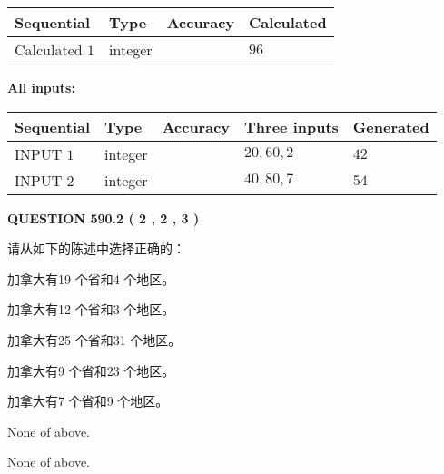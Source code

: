 \documentclass{ctexart}
\begin{document}
  
\noindent\begin{tabular}{|l|l|l|l|}
\hline
 Sequential & Type & Accuracy & Calculated \\ 
\hline
 
 
  Calculated $  1 $ & integer &  & 
  $ 96 $ 
 \\  \hline  
 \end{tabular}
   
   
   
   
\noindent\vspace{0.1in}\hspace{-0.08in} {\textbf{\Large{All inputs: }}}
   
   
  
  
\noindent\begin{tabular}{|l|l|l|l|l|}
\hline
 Sequential & Type & Accuracy & Three inputs & Generated \\ 
\hline
 
 
  INPUT $  1 $ & integer &  & $
 20
 , 
 60
 , 
 2
 $ & $ 42 $ 
 \\  \hline  
 
 
  INPUT $  2 $ & integer &  & $
 40
 , 
 80
 , 
 7
 $ & $ 54 $ 
 \\  \hline  
 \end{tabular}
   
   
  
\vspace{0.2in}
  
{\textbf{\Large{QUESTION
590.2 
 ( 2 , 2 , 3 )
}}}
  
  
请从如下的陈述中选择正确的：
 
 
加拿大有19 个省和4 个地区。
 
 
加拿大有12 个省和3 个地区。
 
 
加拿大有25 个省和31 个地区。
 
 
加拿大有9 个省和23 个地区。
 
 
加拿大有7 个省和9 个地区。
 
 
 None of above.
 
 
\noindent{}
 
 
 None of above.
 
 
\noindent{}
 
\end{document}
